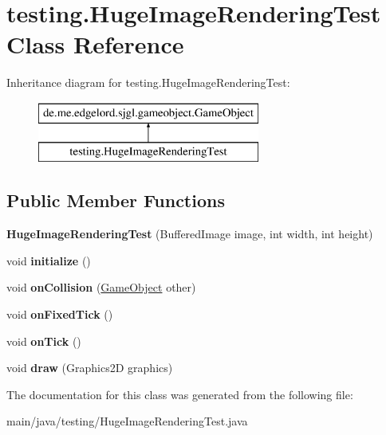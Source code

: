 \hypertarget{classtesting_1_1_huge_image_rendering_test}{}\section{testing.\+Huge\+Image\+Rendering\+Test Class Reference}
\label{classtesting_1_1_huge_image_rendering_test}
Inheritance diagram for testing.\+Huge\+Image\+Rendering\+Test\+:\begin{figure}[H]
\begin{center}
\leavevmode
\includegraphics[height=2.000000cm]{classtesting_1_1_huge_image_rendering_test}
\end{center}
\end{figure}
\subsection*{Public Member Functions}
\begin{DoxyCompactItemize}
\item 
\mbox{\label{classtesting_1_1_huge_image_rendering_test_a450636d7852759350d19af84d8b974ae}} 
{\bfseries Huge\+Image\+Rendering\+Test} (Buffered\+Image image, int width, int height)
\item 
\mbox{\label{classtesting_1_1_huge_image_rendering_test_a60d8d56d17c2de8141a7ab09066a81ee}} 
void {\bfseries initialize} ()
\item 
\mbox{\label{classtesting_1_1_huge_image_rendering_test_a80041e6a2a0df5776c44c17ce461b0bd}} 
void {\bfseries on\+Collision} (\mbox{\hyperlink{classde_1_1me_1_1edgelord_1_1sjgl_1_1gameobject_1_1_game_object}{Game\+Object}} other)
\item 
\mbox{\label{classtesting_1_1_huge_image_rendering_test_a9ed1023029a804074c00512518fd4779}} 
void {\bfseries on\+Fixed\+Tick} ()
\item 
\mbox{\label{classtesting_1_1_huge_image_rendering_test_acd908123429bd4879b72cca2cb178155}} 
void {\bfseries on\+Tick} ()
\item 
\mbox{\label{classtesting_1_1_huge_image_rendering_test_af03e54907d21b03ef8d7715a1beb0006}} 
void {\bfseries draw} (Graphics2D graphics)
\end{DoxyCompactItemize}


The documentation for this class was generated from the following file\+:\begin{DoxyCompactItemize}
\item 
main/java/testing/Huge\+Image\+Rendering\+Test.\+java\end{DoxyCompactItemize}
